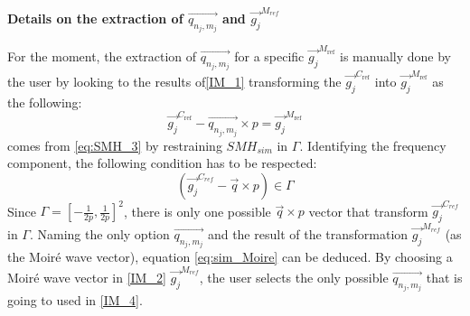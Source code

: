 \documentclass[12pt]{article}
\begin{document}
\noindent\textbf{Details on the extraction of $\overrightarrow{q_{n_j,m_j}}$ and $\overrightarrow{g_j}^{M_{ref}}$}\bigskip

For the moment, the extraction of $\overrightarrow{q_{n_j,m_j}}$ for a specific $ \overrightarrow{g_j}^{M_{\text{ref}}}$ is manually done by the user by looking to the results of\cref{IM_1} transforming the $\overrightarrow{g_j}^{C_{\text{ref}}}$ into $\overrightarrow{g_j}^{M_{\text{ref}}}$ as the following:
\begin{equation}
\label{eq:sim_Moire}
{\overrightarrow{g_j}^{C_{\text{ref}}}}-\overrightarrow{q_{n_j,m_j}}\times p =  \overrightarrow{g_j}^{M_{\text{ref}}}
\end{equation}
 comes from \cref{eq:SMH_3} by restraining $SMH_{sim}$ in $\Gamma$. Identifying the frequency component, the following condition has to be respected:
\begin{equation*}
(\overrightarrow{g_j}^{C_{ref}}-\overrightarrow{q}\times p) \in \Gamma
\end{equation*}
Since $\Gamma = [-\frac{1}{2p},\frac{1}{2p}]^{2}$, there is only one possible $\overrightarrow{q}\times p$ vector that transform $\overrightarrow{g_j}^{C_{ref}}$ in $\Gamma$. Naming the only option $\overrightarrow{q_{n_j,m_j}}$ and the result of the transformation $\overrightarrow{g_j}^{M_{ref}}$ (as the Moir{\'e} wave vector), equation \cref{eq:sim_Moire} can be deduced. By choosing a Moir{\'e} wave vector in \cref{IM_2} $\overrightarrow{g_j}^{M_{ref}}$, the user selects the only possible $\overrightarrow{q_{n_j,m_j}}$ that is going to used in \cref{IM_4}.
\end{document}
